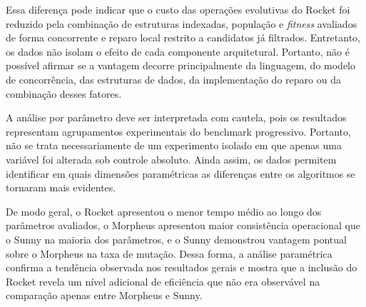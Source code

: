 Essa diferença pode indicar que o custo das operações evolutivas do Rocket foi reduzido pela combinação de estruturas indexadas, população e \textit{fitness} avaliados de forma concorrente e reparo local restrito a candidatos já filtrados. Entretanto, os dados não isolam o efeito de cada componente arquitetural. Portanto, não é possível afirmar se a vantagem decorre principalmente da linguagem, do modelo de concorrência, das estruturas de dados, da implementação do reparo ou da combinação desses fatores.

A análise por parâmetro deve ser interpretada com cautela, pois os resultados representam agrupamentos experimentais do benchmark progressivo. Portanto, não se trata necessariamente de um experimento isolado em que apenas uma variável foi alterada sob controle absoluto. Ainda assim, os dados permitem identificar em quais dimensões paramétricas as diferenças entre os algoritmos se tornaram mais evidentes.

De modo geral, o Rocket apresentou o menor tempo médio ao longo dos parâmetros avaliados, o Morpheus apresentou maior consistência operacional que o Sunny na maioria dos parâmetros, e o Sunny demonstrou vantagem pontual sobre o Morpheus na taxa de mutação. Dessa forma, a análise paramétrica confirma a tendência observada nos resultados gerais e mostra que a inclusão do Rocket revela um nível adicional de eficiência que não era observável na comparação apenas entre Morpheus e Sunny.
